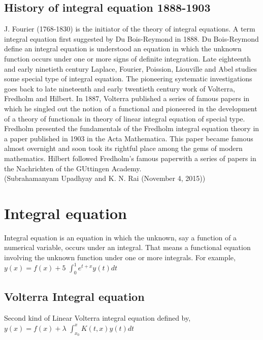 \documentclass[12pt]{article}
\begin{document}
\subsection{History of integral equation 1888-1903}
J. Fourier (1768-1830) is the initiator of the theory of integral equations. A term integral equation first suggested by Du Bois-Reymond in 1888. Du Bois-Reymond define an integral equation is understood an equation in which the unknown function occurs under one or more signs of definite integration. Late eighteenth and early ninetieth century Laplace, Fourier, Poission, Liouville and Abel studies some special type of integral equation. The pioneering systematic investigations goes back to late nineteenth and early twentieth century work of Volterra, Fredholm and Hilbert. In 1887, Volterra published a series of famous papers in which he singled out the notion of a functional and pioneered in the development of a theory of functionals in theory of linear integral equation of special type. Fredholm presented the fundamentals of the Fredholm integral equation theory in a paper published in 1903 in the Acta Mathematica. This paper became famous almost overnight and soon took its rightful place among the gems of modern mathematics. Hilbert followed Fredholm’s famous paperwith a series of papers in the Nachrichten of the GUttingen Academy.
\\

(Subrahamanyam Upadhyay and K. N. Rai (November 4, 2015))
\\

\section{Integral equation}
Integral equation is an equation in which the unknown, say a function of a numerical variable, occurs under an integral. That means a functional equation involving the unknown function under one or more integrals. For example,
\\

$y(x) = f(x) + 5$ \(\int_{0}^{1} e^{t+x} y(t)dt\)

\subsection{Volterra Integral equation}
Second kind of Linear Volterra integral equation defined by,
\\

$y(x) = f(x) + \lambda$ \(\int_{x_0}^{x} K(t,x)y(t)dt\)\\
\end{document}
